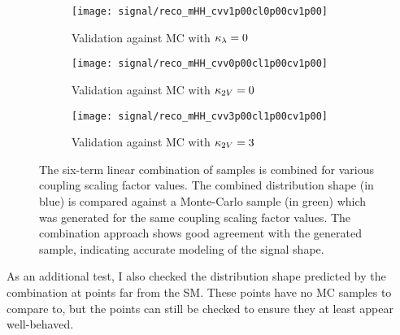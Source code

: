     \begin{figure}[tbh]
    	\centering
        \begin{subfigure}{0.32\textwidth}
            \texttt{[image: signal/reco\_mHH\_cvv1p00cl0p00cv1p00]}
            \captionsetup{justification=centering} \caption{Validation against MC with $\kappa_{\lambda}=0$}
        \end{subfigure}
        \begin{subfigure}{0.32\textwidth}
            \texttt{[image: signal/reco\_mHH\_cvv0p00cl1p00cv1p00]}
            \captionsetup{justification=centering} \caption{Validation against MC with $\kappa_{2V}=0$}
        \end{subfigure}
        \begin{subfigure}{0.32\textwidth}
            \texttt{[image: signal/reco\_mHH\_cvv3p00cl1p00cv1p00]}
            \captionsetup{justification=centering} \caption{Validation against MC with $\kappa_{2V}=3$}
        \end{subfigure}
        \caption{
            The six-term linear combination of samples is combined for various coupling scaling factor values.
            The combined distribution shape (in blue) is compared against a Monte-Carlo sample (in green)
                which was generated for the same coupling scaling factor values.
            The combination approach shows good agreement with the generated sample, indicating accurate modeling of the signal shape.
        }
        \label{fig:vbf_hh_validation}
    \end{figure}

    As an additional test, I also checked the distribution shape predicted by the combination at points far from the SM.
    These points have no MC samples to compare to, but the points can still be checked to ensure they at least appear well-behaved.

